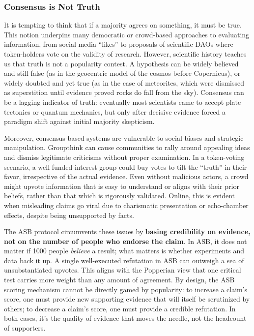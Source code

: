 \documentclass{article}
\begin{document}
\subsubsection{Consensus is Not Truth}
It is tempting to think that if a majority agrees on something, it must be true. This notion underpins many democratic or crowd-based approaches to evaluating information, from social media ``likes'' to proposals of scientific DAOs where token-holders vote on the validity of research. However, scientific history teaches us that truth is not a popularity contest. A hypothesis can be widely believed and still false (as in the geocentric model of the cosmos before Copernicus), or widely doubted and yet true (as in the case of meteorites, which were dismissed as superstition until evidence proved rocks do fall from the sky). Consensus can be a lagging indicator of truth: eventually most scientists came to accept plate tectonics or quantum mechanics, but only after decisive evidence forced a paradigm shift against initial majority skepticism.

Moreover, consensus-based systems are vulnerable to social biases and strategic manipulation. Groupthink can cause communities to rally around appealing ideas and dismiss legitimate criticisms without proper examination. In a token-voting scenario, a well-funded interest group could buy votes to tilt the ``truth'' in their favor, irrespective of the actual evidence. Even without malicious actors, a crowd might upvote information that is easy to understand or aligns with their prior beliefs, rather than that which is rigorously validated. Online, this is evident when misleading claims go viral due to charismatic presentation or echo-chamber effects, despite being unsupported by facts.

The ASB protocol circumvents these issues by \textbf{basing credibility on evidence, not on the number of people who endorse the claim}. In ASB, it does not matter if 1000 people \emph{believe} a result; what matters is whether experiments and data back it up. A single well-executed refutation in ASB can outweigh a sea of unsubstantiated upvotes. This aligns with the Popperian view that one critical test carries more weight than any amount of agreement. By design, the ASB scoring mechanism cannot be directly gamed by popularity: to increase a claim's score, one must provide new supporting evidence that will itself be scrutinized by others; to decrease a claim's score, one must provide a credible refutation. In both cases, it's the quality of evidence that moves the needle, not the headcount of supporters.
\end{document}
